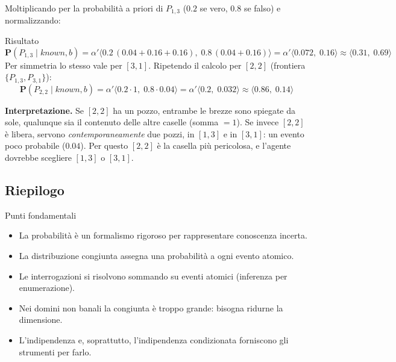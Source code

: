 \documentclass[11pt, a4paper]{article}
\renewcommand{\emph}[1]{\textcolor{verdechiaro}{\itshape #1}}
\newcommand{\Pv}{\mathbf{P}}               %
\newcommand{\tup}[1]{\langle #1 \rangle}    %
\newcommand{\known}{\mathit{known}}
\begin{document}
Moltiplicando per la probabilità a priori di $P_{1,3}$ ($0.2$ se vero, $0.8$ se falso) e normalizzando:

\begin{chiave}{Risultato}
  \[
    \Pv(P_{1,3} \mid \known, b) = \alpha' \tup{0.2\,(0.04 + 0.16 + 0.16),\; 0.8\,(0.04 + 0.16)}
    = \alpha' \tup{0.072,\; 0.16} \approx \tup{0.31,\; 0.69}
  \]
  Per simmetria lo stesso vale per $[3,1]$. Ripetendo il calcolo per $[2,2]$ (frontiera $\{P_{1,3}, P_{3,1}\}$):
  \[
    \Pv(P_{2,2} \mid \known, b) = \alpha' \tup{0.2 \cdot 1,\; 0.8 \cdot 0.04} = \alpha'\tup{0.2,\; 0.032} \approx \tup{0.86,\; 0.14}
  \]
\end{chiave}

\textbf{Interpretazione.} Se $[2,2]$ ha un pozzo, entrambe le brezze sono spiegate da sole, qualunque sia il contenuto delle altre caselle (somma $=1$). Se invece $[2,2]$ è libera, servono \emph{contemporaneamente} due pozzi, in $[1,3]$ e in $[3,1]$: un evento poco probabile ($0.04$). Per questo $[2,2]$ è la casella più pericolosa, e l'agente dovrebbe scegliere $[1,3]$ o $[3,1]$.

\subsection{Riepilogo}

\begin{riepilogo}{Punti fondamentali}
  \begin{itemize}
    \item La probabilità è un formalismo rigoroso per rappresentare conoscenza incerta.
    \item La distribuzione congiunta assegna una probabilità a ogni evento atomico.
    \item Le interrogazioni si risolvono sommando su eventi atomici (inferenza per enumerazione).
    \item Nei domini non banali la congiunta è troppo grande: bisogna ridurne la dimensione.
    \item L'indipendenza e, soprattutto, l'indipendenza condizionata forniscono gli strumenti per farlo.
  \end{itemize}
\end{riepilogo}
\end{document}
